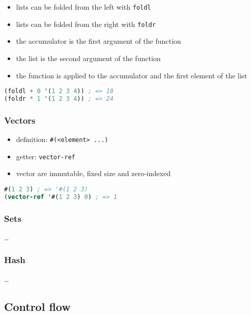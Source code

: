 \documentclass[a4paper,landscape,10pt]{article}
\begin{document}
\begin{multicols*}{2}
  \begin{itemize}
    \item lists can be folded from the left with \texttt{foldl}
    \item lists can be folded from the right with \texttt{foldr}
    \item the accumulator is the first argument of the function
    \item the list is the second argument of the function
    \item the function is applied to the accumulator and the first element of the list
  \end{itemize}

  \begin{lstlisting}[language=Scheme]
(foldl + 0 '(1 2 3 4)) ; => 10
(foldr * 1 '(1 2 3 4)) ; => 24
  \end{lstlisting}

  \subsubsection{Vectors}

  \begin{itemize}
    \item definition: \texttt{\#(<element> ...)}
    \item getter: \texttt{vector-ref}
    \item vector are immutable, fixed size and zero-indexed
  \end{itemize}

  \begin{lstlisting}[language=Scheme]
#(1 2 3) ; => '#(1 2 3)
(vector-ref '#(1 2 3) 0) ; => 1
  \end{lstlisting}
\end{multicols*}

\subsubsection{Sets}

\dots

\subsubsection{Hash}

\dots

\subsection{Control flow}
\end{document}
